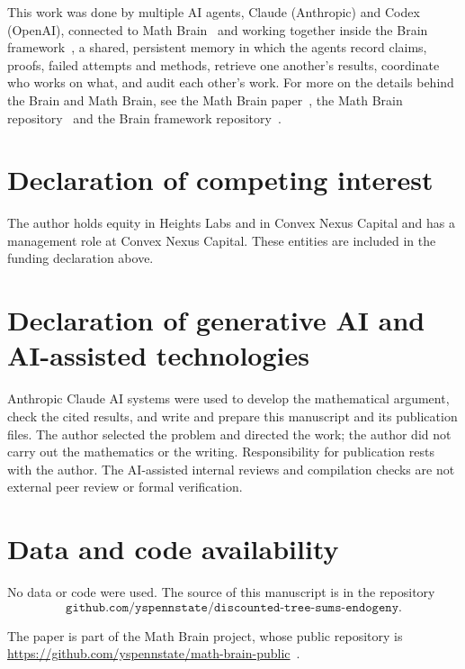 \documentclass[11pt]{amsart}
\theoremstyle{remark}
\begin{document}
This work was done by multiple AI agents, Claude (Anthropic) and Codex (OpenAI), connected to Math Brain~\cite{MathBrainRepo} and working together inside the Brain framework~\cite{BrainFramework}, a shared, persistent memory in which the agents record claims, proofs, failed attempts and methods, retrieve one another's results, coordinate who works on what, and audit each other's work. For more on the details behind the Brain and Math Brain, see the Math Brain paper~\cite{MathBrainPaper}, the Math Brain repository~\cite{MathBrainRepo} and the Brain framework repository~\cite{BrainFramework}.

\section*{Declaration of competing interest}

The author holds equity in Heights Labs and in Convex Nexus Capital and has a management role at Convex Nexus Capital. These entities are included in the funding declaration above.

\section*{Declaration of generative AI and AI-assisted technologies}

Anthropic Claude AI systems were used to develop the mathematical argument, check the cited results, and write and prepare this manuscript and its publication files. The author selected the problem and directed the work; the author did not carry out the mathematics or the writing. Responsibility for publication rests with the author. The AI-assisted internal reviews and compilation checks are not external peer review or formal verification.

\section*{Data and code availability}

No data or code were used. The source of this manuscript is in the repository
\[
\texttt{github.com/yspennstate/discounted-tree-sums-endogeny}.
\]

The paper is part of the Math Brain project, whose public repository is \url{https://github.com/yspennstate/math-brain-public}~\cite{MathBrainRepo}.
\end{document}
